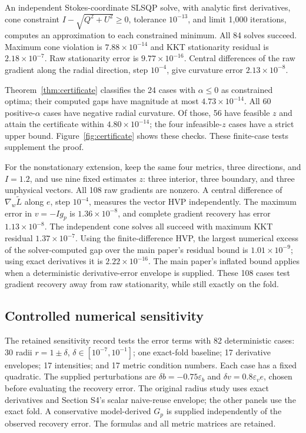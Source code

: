 \documentclass[10pt,a4paper]{article}
\begin{document}
An independent Stokes-coordinate SLSQP solve, with analytic first derivatives, cone constraint $I-\sqrt{Q^2+U^2}\geq0$, tolerance $10^{-13}$, and limit 1,000 iterations, computes an approximation to each constrained minimum. All 84 solves succeed. Maximum cone violation is $7.88\times10^{-14}$ and KKT stationarity residual is $2.18\times10^{-7}$. Raw stationarity error is $9.77\times10^{-16}$. Central differences of the raw gradient along the radial direction, step $10^{-4}$, give curvature error $2.13\times10^{-8}$.

Theorem~\ref{thm:certificate} classifies the 24 cases with $\alpha\leq0$ as constrained optima; their computed gaps have magnitude at most $4.73\times10^{-14}$. All 60 positive-$\alpha$ cases have negative radial curvature. Of those, 56 have feasible $z$ and attain the certificate within $4.80\times10^{-14}$; the four infeasible-$z$ cases have a strict upper bound. Figure~\ref{fig:certificate} shows these checks. These finite-case tests supplement the proof.

For the nonstationary extension, keep the same four metrics, three directions, and $I=1.2$, and use nine fixed estimates $z$: three interior, three boundary, and three unphysical vectors. All 108 raw gradients are nonzero. A central difference of $\nabla_w\widetilde L$ along $e$, step $10^{-4}$, measures the vector HVP independently. The maximum error in $v=-Ig_p$ is $1.36\times10^{-8}$, and complete gradient recovery has error $1.13\times10^{-8}$. The independent cone solves all succeed with maximum KKT residual $1.37\times10^{-7}$. Using the finite-difference HVP, the largest numerical excess of the solver-computed gap over the main paper's residual bound is $1.01\times10^{-9}$; using exact derivatives it is $2.22\times10^{-16}$. The main paper's inflated bound applies when a deterministic derivative-error envelope is supplied. These 108 cases test gradient recovery away from raw stationarity, while still exactly on the fold.




\subsection{Controlled numerical sensitivity}
The retained sensitivity record tests the error terms with 82 deterministic cases: 30 radii $r=1\pm\delta$, $\delta\in[10^{-7},10^{-1}]$; one exact-fold baseline; 17 derivative envelopes; 17 intensities; and 17 metric condition numbers. Each case has a fixed quadratic. The supplied perturbations are $\delta b=-0.75\varepsilon_b$ and $\delta v=0.8\varepsilon_ve$, chosen before evaluating the recovery error. The original radius study uses exact derivatives and Section S4's scalar naive-reuse envelope; the other panels use the exact fold. A conservative model-derived $G_p$ is supplied independently of the observed recovery error. The formulas and all metric matrices are retained.
\end{document}
